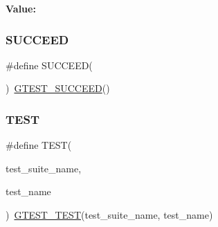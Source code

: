 {\bfseries Value\+:}
\begin{DoxyCode}{0}

\end{DoxyCode}
\mbox{\label{_obj__test_2lib_2googletest-master_2googletest_2include_2gtest_2gtest_8h_a75adcdf89f69b0b615e395daafc315af}} 
\subsubsection{\texorpdfstring{SUCCEED}{SUCCEED}}
{\footnotesize\ttfamily \#define S\+U\+C\+C\+E\+ED(\begin{DoxyParamCaption}{ }\end{DoxyParamCaption})~\mbox{\hyperlink{_obj__test_2lib_2googletest-release-1_88_81_2googletest_2include_2gtest_2gtest_8h_a2690441c38202728f4159ac2462d9720}{G\+T\+E\+S\+T\+\_\+\+S\+U\+C\+C\+E\+ED}}()}

\mbox{\label{_obj__test_2lib_2googletest-master_2googletest_2include_2gtest_2gtest_8h_ab5540a6d621853916be8240ff51819cf}} 
\subsubsection{\texorpdfstring{TEST}{TEST}}
{\footnotesize\ttfamily \#define T\+E\+ST(\begin{DoxyParamCaption}\item[{}]{test\+\_\+suite\+\_\+name,  }\item[{}]{test\+\_\+name }\end{DoxyParamCaption})~\mbox{\hyperlink{_obj__test_2lib_2googletest-release-1_88_81_2googletest_2test_2gtest__unittest_8cc_a54247aeadc0617105812dca8609638de}{G\+T\+E\+S\+T\+\_\+\+T\+E\+ST}}(test\+\_\+suite\+\_\+name, test\+\_\+name)}

